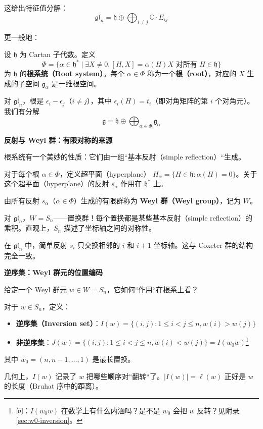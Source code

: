 这给出特征值分解：
$$\mathfrak{gl}_n = \mathfrak{h} \oplus \bigoplus_{i \neq j} \mathbb{C} \cdot E_{ij}$$

更一般地：

\begin{Definition}
设 $\mathfrak{h}$ 为 Cartan 子代数。定义
$$\Phi = \{\alpha \in \mathfrak{h}^* \mid \exists X \neq 0, [H, X] = \alpha(H) X \text{ 对所有 } H \in \mathfrak{h}\}$$
为 $\mathfrak{h}$ 的\textbf{根系统（Root system）}。每个 $\alpha \in \Phi$ 称为一个\textbf{根（root）}，对应的 $X$ 生成的子空间 $\mathfrak{g}_\alpha$ 是一维根空间。

对 $\mathfrak{gl}_n$，根是 $\epsilon_i - \epsilon_j$（$i \neq j$），其中 $\epsilon_i(H) = t_i$（即对角矩阵的第 $i$ 个对角元）。我们有分解
$$\mathfrak{g} = \mathfrak{h} \oplus \bigoplus_{\alpha \in \Phi} \mathfrak{g}_\alpha$$
\end{Definition}

\bigskip
\noindent\textbf{反射与 Weyl 群：有限对称的来源}

根系统有一个美妙的性质：它们由一组``基本反射（simple reflection）``生成。

\begin{Definition}
\label{def:WeylGroup}
对于每个根 $\alpha \in \Phi$，定义超平面（hyperplane） $H_\alpha = \{H \in \mathfrak{h} : \alpha(H) = 0\}$。关于这个超平面（hyperplane）的反射 $s_\alpha$ 作用在 $\mathfrak{h}^*$ 上。

由所有反射 $s_\alpha$（$\alpha \in \Phi$）生成的有限群称为 \textbf{Weyl 群（Weyl group）}，记为 $W$。

对 $\mathfrak{gl}_n$，$W = S_n$——置换群！每个置换都是某些基本反射（simple reflection）的乘积。直观上，$S_n$ 描述了坐标轴之间的对称性。
\end{Definition}

在 $\mathfrak{gl}_n$ 中，简单反射 $s_i$ 只交换相邻的 $i$ 和 $i+1$ 坐标轴。这与 Coxeter 群的结构完全一致。

\bigskip
\noindent\textbf{逆序集：Weyl 群元的位置编码}

给定一个 Weyl 群元 $w \in W = S_n$，它如何``作用``在根系上看？

\begin{Definition}
\label{def:InversionSet}
对于 $w \in S_n$，定义：
\begin{itemize}
\item \textbf{逆序集（Inversion set）}：$I(w) = \{(i,j) : 1 \leq i < j \leq n, w(i) > w(j)\}$
\item \textbf{非逆序集}：$J(w) = \{(i,j) : 1 \leq i < j \leq n, w(i) < w(j)\} = I(w_0 w)$\footnote{问：$I(w_0 w)$ 在数学上有什么内涵吗？是不是 $w_0$ 会把 $w$ 反转？见附录 \cref{sec:w0-inversion}。}
\end{itemize}
其中 $w_0 = (n, n-1, \ldots, 1)$ 是最长置换。

几何上，$I(w)$ 记录了 $w$ 把哪些顺序对``翻转``了。$|I(w)| = \ell(w)$ 正好是 $w$ 的长度（Bruhat 序中的距离）。
\end{Definition}

